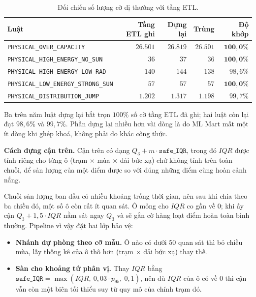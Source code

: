 \documentclass[12pt, a4paper]{report}
\begin{document}
\begin{table}[htbp]
\centering
\caption{Đối chiếu số lượng cờ dị thường với tầng ETL.}
\label{tab:tai_lap_luat}
\small
\begin{tabular}{l r r r r}
\toprule
\textbf{Luật} & \textbf{Tầng ETL ghi} & \textbf{Dựng lại} & \textbf{Trùng} & \textbf{Độ khớp} \\
\midrule
\texttt{PHYSICAL\_OVER\_CAPACITY}          & $26.501$ & $26.819$ & $26.501$ & $\mathbf{100{,}0\%}$ \\
\texttt{PHYSICAL\_HIGH\_ENERGY\_NO\_SUN}   & $36$     & $37$     & $36$     & $\mathbf{100{,}0\%}$ \\
\texttt{PHYSICAL\_HIGH\_ENERGY\_LOW\_RAD}  & $140$    & $144$    & $138$    & $98{,}6\%$ \\
\texttt{PHYSICAL\_LOW\_ENERGY\_STRONG\_SUN}& $57$     & $57$     & $57$     & $\mathbf{100{,}0\%}$ \\
\texttt{PHYSICAL\_DISTRIBUTION\_JUMP}      & $1.202$  & $1.317$  & $1.198$  & $99{,}7\%$ \\
\bottomrule
\end{tabular}
\end{table}

Ba trên năm luật dựng lại bắt trọn $100\%$ số cờ tầng ETL đã ghi; hai luật còn lại đạt
$98{,}6\%$ và $99{,}7\%$. Phần dựng lại nhiều hơn vài dòng là do ML Mart mất một ít dòng khi
ghép khoá, không phải do khác công thức.

\textbf{Cách dựng cận trên.} Cận trên có dạng $Q_3 + m \cdot \texttt{safe\_IQR}$, trong đó
$IQR$ được tính riêng cho từng ô (trạm $\times$ mùa $\times$ dải bức xạ) chứ không
tính trên toàn chuỗi, để sản lượng của một điểm được so với đúng những điểm cùng hoàn cảnh
nắng.

Chuỗi sản lượng ban đầu có nhiều khoảng trống thời gian, nên sau khi chia theo ba chiều đó,
một số ô còn rất ít quan sát. Ô mỏng cho $IQR$ co gần về $0$; khi ấy cận
$Q_3 + 1{,}5 \cdot IQR$ nằm sát ngay $Q_3$ và sẽ gắn cờ hàng loạt điểm hoàn toàn bình
thường. Pipeline vì vậy đặt hai lớp bảo vệ:

\begin{itemize}
    \item \textbf{Nhánh dự phòng theo cỡ mẫu.} Ô nào có dưới $50$ quan sát thì bỏ chiều mùa,
    lấy thống kê của ô thô hơn (trạm $\times$ dải bức xạ) thay thế.
    \item \textbf{Sàn cho khoảng tứ phân vị.} Thay $IQR$ bằng
    $\texttt{safe\_IQR} = \max(IQR,\ 0{,}03 \cdot p_{95},\ 0{,}1)$, nên dù $IQR$ của ô có về
    $0$ thì cận vẫn còn một biên tối thiểu suy từ quy mô của chính trạm đó.
\end{itemize}
\end{document}

